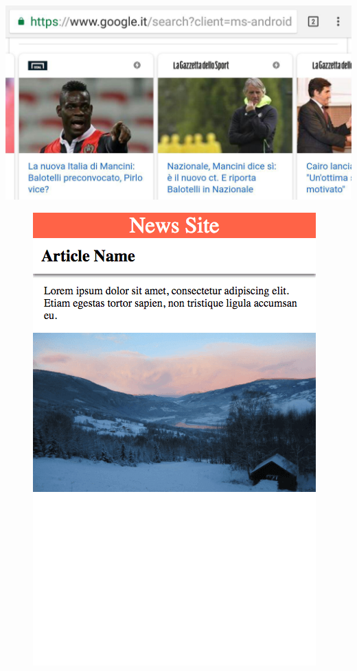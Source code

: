\documentclass[graphic, aspectratio=169]{beamer}
\begin{document}
{\includegraphics[width=\paperwidth,height=\paperheight]{slides/images/amp_nazionale_italiana.jpg}}
\begin{frame}
\end{frame}

\begin{frame}    
    \begin{figure}[h!]
    \centering
    \includegraphics[scale=0.5]{slides/images/article-screenshot.png}
    \label{fig:AMP logo}
    \end{figure}
\end{frame}
    
\end{document}
